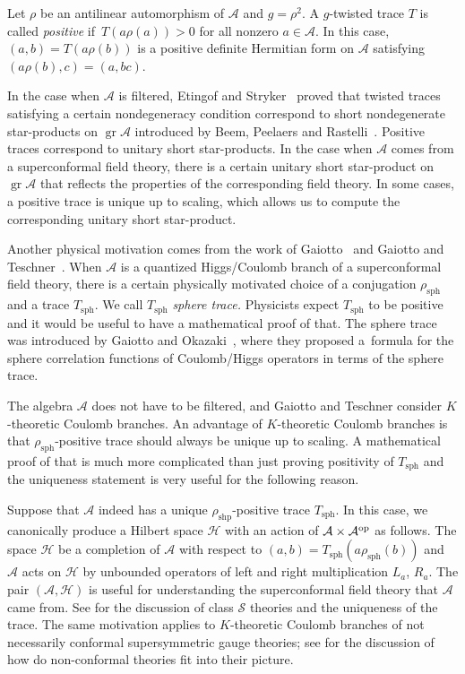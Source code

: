 \documentclass[pdftex]{sigma}
\DeclareMathOperator\gr{gr}
\newcommand{\mc}{\mathcal}
\numberwithin{equation}{section}
\theoremstyle{definition}
\begin{document}
Let $\rho$ be an antilinear automorphism of $\mc{A}$ and $g=\rho^2$. A $g$-twisted trace $T$ is called {\it positive} if~${T(a\rho(a))>0}$ for all nonzero $a\in\mc{A}$. In this case, $(a,b)=T(a\rho(b))$ is a positive definite Hermitian form on $\mc{A}$ satisfying $(a\rho(b),c)=(a,bc)$.

In the case when $\mc{A}$ is filtered, Etingof and Stryker~\cite{etingof2020short} proved that twisted traces satisfying a certain nondegeneracy condition correspond to short nondegenerate star-products on $\gr\mc{A}$ introduced by Beem, Peelaers and Rastelli~\cite{BPR}. Positive traces correspond to unitary short star-products. In the case when $\mc{A}$ comes from a superconformal field theory, there is a certain unitary short star-product on $\gr\mc{A}$ that reflects the properties of the corresponding field theory. In some cases, a positive trace is unique up to scaling, which allows us to compute the corresponding unitary short star-product.

Another physical motivation comes from the work of Gaiotto~\cite{GaiottoSphere} and Gaiotto and Tesch\-ner~\cite{GT}. When $\mc{A}$ is a quantized Higgs/Coulomb branch of a superconformal field theory, there is a certain physically motivated choice of a conjugation $\rho_{\text{sph}}$ and a trace $T_{\text{sph}}$. We call $T_{\text{sph}}$ {\it sphere trace.} Physicists expect $T_{\text{sph}}$ to be positive and it would be useful to have a mathematical proof of that.
The sphere trace was introduced by Gaiotto and Okazaki~\cite{GO}, where they proposed a~formula for the sphere correlation functions of Coulomb/Higgs operators in terms of the sphere trace.

The algebra $\mc{A}$ does not have to be filtered, and Gaiotto and Teschner consider $K$-theoretic Coulomb branches. An advantage of $K$-theoretic Coulomb branches is that $\rho_{\text{sph}}$-positive trace should always be unique up to scaling. A mathematical proof of that is much more complicated than just proving positivity of $T_{\text{sph}}$ and the uniqueness statement is very useful for the following reason.

Suppose that $\mc{A}$ indeed has a unique $\rho_{\text{shp}}$-positive trace $T_{\text{sph}}$. In this case, we canonically produce a Hilbert space $\mc{H}$ with an action of $\mc{A}\times\mc{A}^{{\rm op}}$ as follows. The space $\mc{H}$ be a completion of $\mc{A}$ with respect to $(a,b)=T_{\text{sph}}(a\rho_{\text{sph}}(b))$ and $\mc{A}$ acts on $\mc{H}$ by unbounded operators of left and right multiplication $L_a$, $R_a$. The pair $(\mc{A},\mc{H})$ is useful for understanding the superconformal field theory that $\mc{A}$ came from. See \cite[Section~1.3]{GT} for the discussion of class $\mc{S}$ theories and the uniqueness of the trace. The same motivation applies to $K$-theoretic Coulomb branches of not necessarily conformal supersymmetric gauge theories; see \cite[Section~2.2]{GT} for the discussion of how do non-conformal theories fit into their picture.
\end{document}

